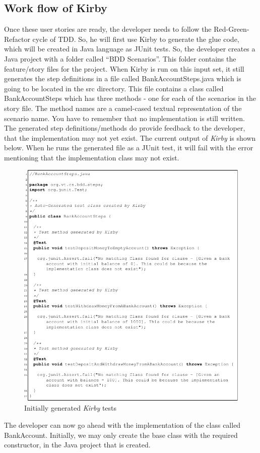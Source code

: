 \documentclass[conference, onecolumn, a4, 12pt]{IEEEtran}
\begin{document}
\subsection{Work flow of Kirby}
Once these user stories are ready, the developer needs to follow the Red-Green-Refactor cycle of TDD. So, he will ﬁrst use Kirby to generate the glue code, which will be created in Java language as JUnit tests. So, the developer creates a Java project with a folder called “BDD Scenarios”. This folder contains
the feature/story ﬁles for the project. When Kirby is run on this input set, it still generates the step deﬁnitions in a ﬁle called BankAccountSteps.java which is going to be located in the src directory. This ﬁle contains a class called BankAccountSteps which has three methods - one for each of the scenarios in the story file. The method names are a camel-cased textual representation of the scenario name. You have to remember that no implementation is still written. The generated step definitions/methods do provide feedback to the developer, that the implementation may not yet exist. The current output of \textit{Kirby} is shown below. When he runs the generated file as a JUnit test, it will fail with the error mentioning that the implementation class may not exist.

\begin{figure}
	\centering
	\includegraphics[width=0.7\linewidth]{Kirby_generated_test_class}
	\caption{Initially generated \textit{Kirby} tests}
	\label{fig:kirbygeneratedtestclass}
\end{figure}

The developer can now go ahead with the implementation of the class called BankAccount. Initially, we may only create the base class with the required constructor, in the Java project that is created.
\end{document}
